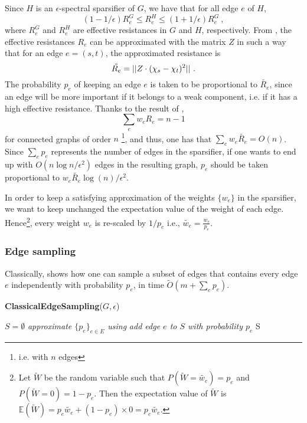 Since $H$ is an $\epsilon$-spectral sparsifier of $G$, we have that for all edge $e$ of $H$,
\begin{equation*}
    (1-1/\epsilon) R^G_e \leq R^H_e \leq (1+1/\epsilon) R^G_e \ ,
\end{equation*} where $R^G_e$ and $R^H_e$ are effective resistances in $G$ and $H$, respectively. 
From , the effective resistances $R_e$ can be approximated with the matrix $Z$
in such a way that for an edge $e = (s,t)$, the approximated resistance is 
\begin{equation*}
    \tilde{R_e} = || Z \cdot (\chi_s-\chi_t)^2 || \text{ .}
\end{equation*}
The probability $p_e$ of keeping an edge $e$ is taken to be proportional to $ \tilde{R_e}$, since an edge will be more important if it belongs to a weak component, i.e. if it has a high effective resistance. Thanks to the result of 
\citeauthor{bollobas_modern_1998} \cite[Theorem 25]{bollobas_modern_1998}, 
$$\sum_e w_e R_e = n-1$$
for connected graphs of order $n$ \footnote{i.e. with $n$ edges}, and thus, one has that $\sum_e w_e \tilde{R_e} = O(n)$. Since $\sum_e p_e$ represents the number of edges in the sparsifier, if one wants to end up with  $O(n \log n /\epsilon^2)$ edges in the resulting graph, $p_e$ should be taken proportional to $w_e \tilde{R_e} \log (n) / \epsilon^2$. 


In order to keep a satisfying approximation of the weights $\{w_e\}$ in the sparsifier, we want to keep unchanged the expectation value of the weight of each edge.
Hence\footnote{Let $\tilde{W}$ be the random variable such that $P(\tilde{W}= \tilde{w_e}) = p_e$ and $P(\tilde{W}= {0}) = 1 - p_e$. Then the expectation value of $\tilde{W}$ is $\mathbb{E}(\tilde{W}) = p_e \tilde{w_e} + (1-p_e) \times 0  = p_e \tilde{w_e}$.}, every weight $w_e$ is re-scaled by $1/p_e$ i.e., $\tilde{w_e} = \frac{w_e}{p_e}$. 


\subsubsection{Edge sampling}

Classically,  shows how one can sample
a subset of edges that contains every edge $e$ independently with
probability $p_e$, in time $\tilde{O}(m + \sum_e p_e)$.

\begin{algorithm}[H]
    \caption{\textbf{ClassicalEdgeSampling}($G,\epsilon$)}\label{alg:classical-edge-sampling}
    \begin{algorithmic}[1]
    \Require $S = \emptyset$
    \State \textit{approximate $\{p_e\}_{e\in E}$ using }
        \State \textit{add edge $e$ to $S$ with probability $p_e$ }
        \EndFor 
    \State \Return S
    \end{algorithmic}
\end{algorithm}


